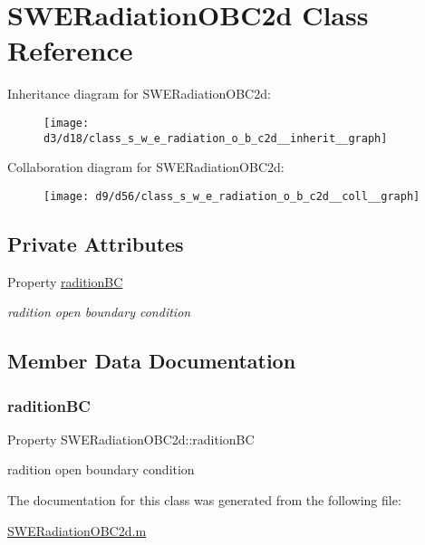 \hypertarget{class_s_w_e_radiation_o_b_c2d}{}\section{S\+W\+E\+Radiation\+O\+B\+C2d Class Reference}
\label{class_s_w_e_radiation_o_b_c2d}


Inheritance diagram for S\+W\+E\+Radiation\+O\+B\+C2d\+:
\nopagebreak
\begin{figure}[H]
\begin{center}
\leavevmode
\texttt{[image: d3/d18/class\_s\_w\_e\_radiation\_o\_b\_c2d\_\_inherit\_\_graph]}
\end{center}
\end{figure}


Collaboration diagram for S\+W\+E\+Radiation\+O\+B\+C2d\+:
\nopagebreak
\begin{figure}[H]
\begin{center}
\leavevmode
\texttt{[image: d9/d56/class\_s\_w\_e\_radiation\_o\_b\_c2d\_\_coll\_\_graph]}
\end{center}
\end{figure}
\subsection*{Private Attributes}
\begin{DoxyCompactItemize}
\item 
Property \hyperlink{class_s_w_e_radiation_o_b_c2d_a1dc3abcd0a358ecc2ad8c40dee6f18a9}{radition\+BC}
\begin{DoxyCompactList}\small\item\em radition open boundary condition \end{DoxyCompactList}\end{DoxyCompactItemize}


\subsection{Member Data Documentation}
\mbox{\label{class_s_w_e_radiation_o_b_c2d_a1dc3abcd0a358ecc2ad8c40dee6f18a9}} 
\subsubsection{\texorpdfstring{radition\+BC}{raditionBC}}
{\footnotesize\ttfamily Property S\+W\+E\+Radiation\+O\+B\+C2d\+::radition\+BC\hspace{0.3cm}{\ttfamily [private]}}



radition open boundary condition 



The documentation for this class was generated from the following file\+:\begin{DoxyCompactItemize}
\item 
\hyperlink{_s_w_e_radiation_o_b_c2d_8m}{S\+W\+E\+Radiation\+O\+B\+C2d.\+m}\end{DoxyCompactItemize}
